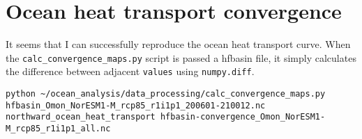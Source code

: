 \section{Ocean heat transport convergence}

It seems that I can successfully reproduce the ocean heat transport curve. When the \verb!calc_convergence_maps.py! script is passed a hfbasin file, it simply calculates the difference between adjacent \texttt{values} using \verb!numpy.diff!.    

\begin{verbatim}
python ~/ocean_analysis/data_processing/calc_convergence_maps.py hfbasin_Omon_NorESM1-M_rcp85_r1i1p1_200601-210012.nc northward_ocean_heat_transport hfbasin-convergence_Omon_NorESM1-M_rcp85_r1i1p1_all.nc
\end{verbatim}